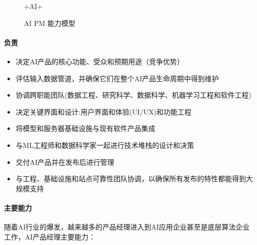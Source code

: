 \documentclass[letterpaper,11pt,english]{sphinxmanual}
\begin{document}
\begin{figure}[H]
\centering
\capstart

\noindent{}
\caption{+AI+\sphinxfootnotemark[84]}\label{\detokenize{chapter_introduction/AI_PM:id35}}\end{figure}
%
\begin{footnotetext}[84]\sphinxAtStartFootnote
{}
%
\end{footnotetext}\ignorespaces 
\begin{figure}[H]
\centering
\capstart

\noindent{}
\caption{AI PM 能力模型}\label{\detokenize{chapter_introduction/AI_PM:id36}}\end{figure}


\paragraph{负责}
\label{\detokenize{chapter_introduction/AI_PM:id8}}\begin{itemize}
\item {} 
决定AI产品的核心功能、受众和预期用途（竞争优势）

\item {} 
评估输入数据管道，并确保它们在整个AI产品生命周期中得到维护

\item {} 
协调跨职能团队(数据工程、研究科学、数据科学、机器学习工程和软件工程)

\item {} 
决定关键界面和设计:用户界面和体验(UI/UX)和功能工程

\item {} 
将模型和服务器基础设施与现有软件产品集成

\item {} 
与ML工程师和数据科学家一起进行技术堆栈的设计和决策

\item {} 
交付AI产品并在发布后进行管理

\item {} 
与工程、基础设施和站点可靠性团队协调，以确保所有发布的特性都能得到大规模支持

\end{itemize}


\paragraph{主要能力}
\label{\detokenize{chapter_introduction/AI_PM:id9}}
随着AI行业的爆发，越来越多的产品经理进入到AI应用企业甚至是底层算法企业工作，AI产品经理主要能力：
\end{document}
